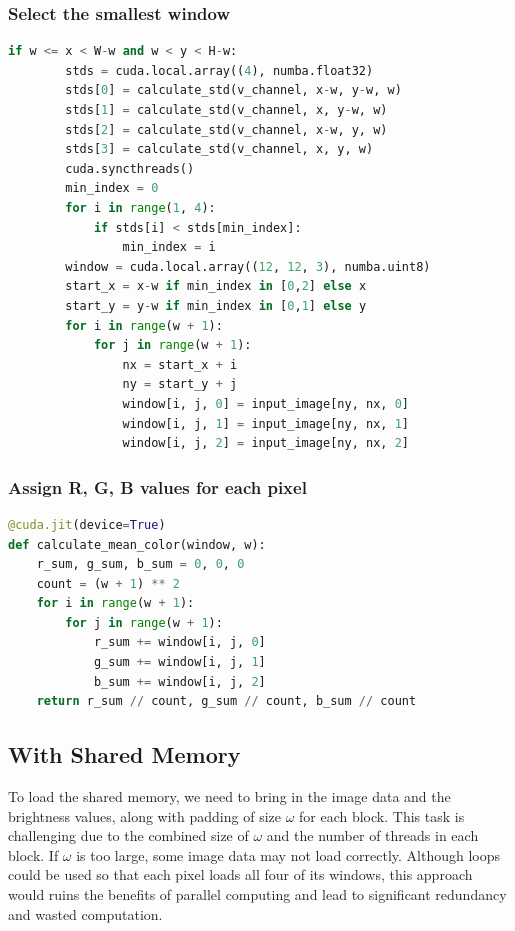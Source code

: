 \documentclass{article}
\begin{document}
\subsubsection{Select the smallest window }
\begin{lstlisting}[language=Python]
if w <= x < W-w and w < y < H-w:
        stds = cuda.local.array((4), numba.float32)
        stds[0] = calculate_std(v_channel, x-w, y-w, w)
        stds[1] = calculate_std(v_channel, x, y-w, w)       
        stds[2] = calculate_std(v_channel, x-w, y, w)
        stds[3] = calculate_std(v_channel, x, y, w)
        cuda.syncthreads()
        min_index = 0
        for i in range(1, 4):
            if stds[i] < stds[min_index]:
                min_index = i
        window = cuda.local.array((12, 12, 3), numba.uint8)
        start_x = x-w if min_index in [0,2] else x
        start_y = y-w if min_index in [0,1] else y
        for i in range(w + 1):
            for j in range(w + 1):
                nx = start_x + i
                ny = start_y + j
                window[i, j, 0] = input_image[ny, nx, 0]
                window[i, j, 1] = input_image[ny, nx, 1]
                window[i, j, 2] = input_image[ny, nx, 2]
\end{lstlisting}

\subsubsection{Assign R, G, B values for each pixel}
\begin{lstlisting}[language=Python]
@cuda.jit(device=True)
def calculate_mean_color(window, w):
    r_sum, g_sum, b_sum = 0, 0, 0
    count = (w + 1) ** 2
    for i in range(w + 1):
        for j in range(w + 1):
            r_sum += window[i, j, 0]
            g_sum += window[i, j, 1]
            b_sum += window[i, j, 2]
    return r_sum // count, g_sum // count, b_sum // count
\end{lstlisting}

\subsection{With Shared Memory}
To load the shared memory, we need to bring in the image data and the brightness values, along with padding of size $\omega$ for each block. 
This task is challenging due to the combined size of $\omega$ and the number of threads in each block. If $\omega$ is too large, some image data may not load correctly. 
Although loops could be used so that each pixel loads all four of its windows, this approach would ruins the benefits of parallel computing and lead to significant redundancy and wasted computation.
\end{document}

